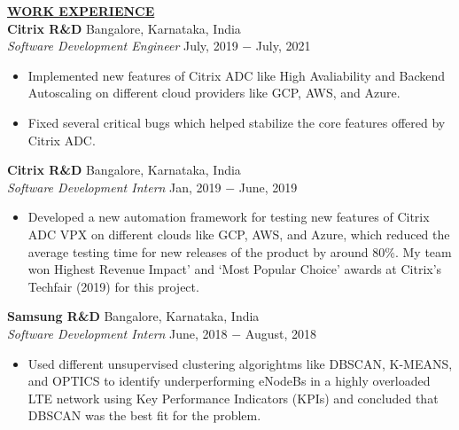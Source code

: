 \documentclass{article}
\begin{document}
% 
%
\noindent \textbf{\underline{WORK EXPERIENCE}} \\
\noindent \textbf{Citrix R\&D} \hfill Bangalore, Karnataka, India \\
\textit{Software Development Engineer} \hfill July, 2019 $-$ July, 2021
\begin{itemize}[noitemsep,nolistsep,leftmargin=*]
\item {Implemented new features of Citrix ADC like High Avaliability and Backend Autoscaling on different cloud providers like GCP, AWS, and Azure.}
\item {Fixed several critical bugs which helped stabilize the core features offered by Citrix ADC. \\}
\end{itemize}

\noindent \textbf{Citrix R\&D} \hfill Bangalore, Karnataka, India \\
\textit{Software Development Intern} \hfill Jan, 2019 $-$ June, 2019
\begin{itemize}[noitemsep,nolistsep,leftmargin=*]
\item {Developed a new automation framework for testing new features of Citrix ADC VPX on different clouds like GCP, AWS, and Azure, which reduced the average testing time for new releases of the product by around 80\%. My team won Highest Revenue Impact’ and ‘Most Popular Choice’ awards at Citrix's Techfair (2019) for this project.\\}
\end{itemize}

\noindent \textbf{Samsung R\&D} \hfill Bangalore, Karnataka, India \\
\textit{Software Development Intern} \hfill June, 2018 $-$ August, 2018
\begin{itemize}[noitemsep,nolistsep,leftmargin=*]
\item {Used different unsupervised clustering algorightms like DBSCAN, K-MEANS, and OPTICS to identify underperforming eNodeBs in a highly overloaded LTE network using Key Performance Indicators (KPIs) and concluded that DBSCAN was the best fit for the problem. \\}
\end{itemize}
\end{document}
